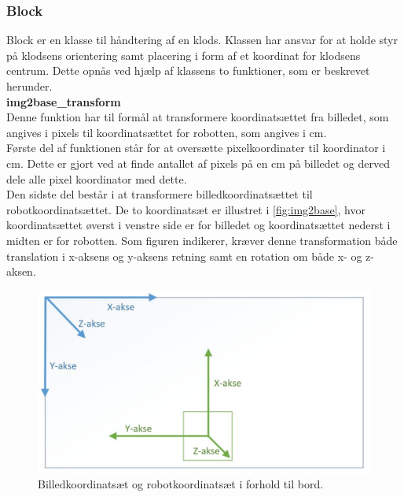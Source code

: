 \subsubsection{Block} %
\label{subsub:block}

Block er en klasse til håndtering af en klods. Klassen har ansvar for at holde styr på klodsens orientering samt placering i form af et koordinat for klodsens centrum. Dette opnås ved hjælp af klassens to funktioner, som er beskrevet herunder. \\

\textbf{img2base\_transform} \\
Denne funktion har til formål at transformere koordinatsættet fra billedet, som angives i pixels til koordinatsættet for robotten, som angives i cm.\\

Første del af funktionen står for at oversætte pixelkoordinater til koordinator i cm. Dette er gjort ved at finde antallet af pixels på en cm på billedet og derved dele alle pixel koordinator med dette. \\

Den sidste del består i at transformere billedkoordinatsættet til robotkoordinatsættet. De to koordinatsæt er illustret i \autoref{fig:img2base}, hvor koordinatsættet øverst i venstre side er for billedet og koordinatsættet nederst i midten er for robotten. Som figuren indikerer, kræver denne transformation både translation i x-aksens og y-aksens retning samt en rotation om både x- og z-aksen. \\ 


\begin{figure}[h]
\centering
\includegraphics[scale=0.4]{images/img2base}
\caption{Billedkoordinatsæt og robotkoordinatsæt i forhold til bord.}
\label{fig:img2base}
\end{figure}

